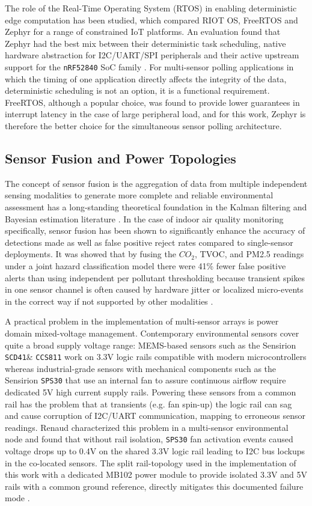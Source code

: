 \documentclass[conference]{IEEEtran}
\begin{document}
The role of the Real-Time Operating System (RTOS) in enabling deterministic edge computation has been studied, which compared RIOT OS, FreeRTOS and Zephyr for a range of constrained IoT platforms. An evaluation found that Zephyr had the best mix between their deterministic task scheduling, native hardware abstraction for I2C/UART/SPI peripherals and their active upstream support for the \texttt{nRF52840} SoC family \cite{b9}. For multi-sensor polling applications in which the timing of one application directly affects the integrity of the data, deterministic scheduling is not an option, it is a functional requirement. FreeRTOS, although a popular choice, was found to provide lower guarantees in interrupt latency in the case of large peripheral load, and for this work, Zephyr is therefore the better choice for the simultaneous sensor polling architecture.


\subsection{Sensor Fusion and Power Topologies}

The concept of sensor fusion is the aggregation of data from multiple independent sensing modalities to generate more complete and reliable environmental assessment has a long-standing theoretical foundation in the Kalman filtering and Bayesian estimation literature \cite{b10}. In the case of indoor air quality monitoring specifically, sensor fusion has been shown to significantly enhance the accuracy of detections made as well as false positive reject rates compared to single-sensor deployments. It was showed that by fusing the $CO_2$, TVOC, and PM2.5 readings under a joint hazard classification model there were 41\% fewer false positive alerts than using independent per pollutant thresholding because transient spikes in one sensor channel is often caused by hardware jitter or localized micro-events in the correct way if not supported by other modalities \cite{b11}.

A practical problem in the implementation of multi-sensor arrays is power domain mixed-voltage management. Contemporary environmental sensors cover quite a broad supply voltage range: MEMS-based sensors such as the Sensirion \texttt{SCD41}\& \texttt{CCS811} work on 3.3V logic rails compatible with modern microcontrollers whereas industrial-grade sensors with mechanical components such as the Sensirion \texttt{SPS30} that use an internal fan to assure continuous airflow require dedicated 5V high current supply rails. Powering these sensors from a common rail has the problem that at transients (e.g. fan spin-up) the logic rail can sag and cause corruption of I2C/UART communication, mapping to erroneous sensor readings. Renaud characterized this problem in a multi-sensor environmental node and found that without rail isolation, \texttt{SPS30} fan activation events caused voltage drops up to 0.4V on the shared 3.3V logic rail leading to I2C bus lockups in the co-located sensors. The split rail-topology used in the implementation of this work with a dedicated MB102 power module to provide isolated 3.3V and 5V rails with a common ground reference, directly mitigates this documented failure mode \cite{b12}.
\end{document}
